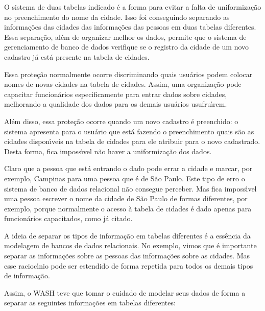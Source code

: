 \documentclass[
12pt,		%
openright,	%
twoside,  %
a4paper,			%
chapter=TITLE,		%
english,			%
french,				%
spanish,			%
brazil				%
]{USPSC-classe/USPSC}
\begin{document}
O sistema de duas tabelas indicado \'e a forma para evitar a falta de uniformiza\c{c}\~ao no preenchimento do nome da cidade. Isso foi conseguindo separando as informa\c{c}\~oes das cidades das informa\c{c}\~oes das pessoas em duas tabelas diferentes. Essa separa\c{c}\~ao, al\'em de organizar melhor os dados, permite que o sistema de gerenciamento de banco de dados verifique se o registro da cidade de um novo cadastro j\'a est\'a presente na tabela de cidades.




Essa prote\c{c}\~ao normalmente ocorre discriminando quais usu\'arios podem colocar nomes de novas cidades na tabela de cidades. Assim, uma organiza\c{c}\~ao pode capacitar funcion\'arios especificamente para entrar dados sobre cidades, melhorando a qualidade dos dados para os demais usu\'arios usufru\'{\i}rem.




Al\'em disso, essa prote\c{c}\~ao ocorre quando um novo cadastro \'e preenchido: o sistema apresenta para o usu\'ario que est\'a fazendo o preenchimento quais s\~ao as cidades dispon\'{\i}veis na tabela de cidades para ele atribuir para o novo cadastrado. Desta forma, fica imposs\'{\i}vel n\~ao haver a uniformiza\c{c}\~ao dos dados.




Claro que a pessoa que est\'a entrando o dado pode errar a cidade e marcar, por exemplo, Campinas para uma pessoa que \'e de S\~ao Paulo. Este tipo de erro o sistema de banco de dados relacional n\~ao consegue perceber. Mas fica imposs\'{\i}vel uma pessoa escrever o nome da cidade de S\~ao Paulo de formas diferentes, por exemplo, porque normalmente o acesso \`a tabela de cidades \'e dado apenas para funcion\'arios capacitados, como j\'a citado.




A ideia de separar os tipos de informa\c{c}\~ao em tabelas diferentes \'e a ess\^encia da modelagem de bancos de dados relacionais. No exemplo, vimos que \'e importante separar as informa\c{c}\~oes sobre as pessoas das informa\c{c}\~oes sobre as cidades. Mas esse racioc\'{\i}nio pode ser estendido de forma repetida para todos os demais tipos de informa\c{c}\~ao.




Assim, o WASH teve que tomar o cuidado de modelar seus dados de forma a separar as seguintes informa\c{c}\~oes em tabelas diferentes:
\end{document}
